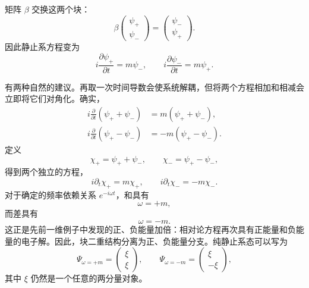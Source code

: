 \begin{classroomqa}
\end{classroomqa}

矩阵 \(\beta\) 交换这两个块：
\begin{equation}
\beta
\begin{pmatrix}
\psi_+\\
\psi_-
\end{pmatrix}
=
\begin{pmatrix}
\psi_-\\
\psi_+
\end{pmatrix}.
\end{equation}
因此静止系方程变为
\begin{equation}
i\frac{\partial\psi_+}{\partial t}=m\psi_-,
\qquad
i\frac{\partial\psi_-}{\partial t}=m\psi_+.
\end{equation}

有两种自然的建议。再取一次时间导数会使系统解耦，但将两个方程相加和相减会立即将它们对角化。确实，
\begin{align}
i\frac{\partial}{\partial t}(\psi_++\psi_-)
&=m(\psi_++\psi_-),\\
i\frac{\partial}{\partial t}(\psi_+-\psi_-)
&=-m(\psi_+-\psi_-).
\end{align}
定义
\begin{equation}
\chi_+=\psi_++\psi_-,
\qquad
\chi_-=\psi_+-\psi_-,
\end{equation}
得到两个独立的方程，
\begin{equation}
i\partial_t\chi_+=m\chi_+,
\qquad
i\partial_t\chi_-=-m\chi_-.
\end{equation}
对于确定的频率依赖关系 \(e^{-i\omega t}\)，和具有
\begin{equation}
\omega=+m,
\end{equation}
而差具有
\begin{equation}
\omega=-m.
\end{equation}
这正是先前一维例子中发现的正、负能量加倍：相对论方程再次具有正能量和负能量的电子解。因此，块二重结构分离为正、负能量分支。纯静止系态可以写为
\begin{equation}
\Psi_{\omega=+m}=
\begin{pmatrix}
\xi\\
\xi
\end{pmatrix},
\qquad
\Psi_{\omega=-m}=
\begin{pmatrix}
\xi\\
-\xi
\end{pmatrix},
\end{equation}
其中 \(\xi\) 仍然是一个任意的两分量对象。

